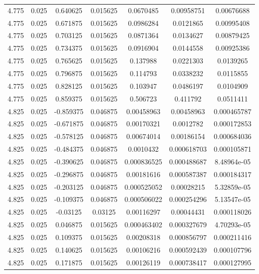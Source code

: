 \begin{table}[bh]
\begin{center}
{\begin{tabular}{ccccccc}
4.775	 & 0.025 & 	0.640625	 & 0.015625	 & 0.0670485	 & 0.00958751	 & 0.00676688 \\ 
4.775	 & 0.025 & 	0.671875	 & 0.015625	 & 0.0986284	 & 0.0121865	 & 0.00995408 \\ 
4.775	 & 0.025 & 	0.703125	 & 0.015625	 & 0.0871364	 & 0.0134627	 & 0.00879425 \\ 
4.775	 & 0.025 & 	0.734375	 & 0.015625	 & 0.0916904	 & 0.0144558	 & 0.00925386 \\ 
4.775	 & 0.025 & 	0.765625	 & 0.015625	 & 0.137988	 & 0.0221303	 & 0.0139265 \\ 
4.775	 & 0.025 & 	0.796875	 & 0.015625	 & 0.114793	 & 0.0338232	 & 0.0115855 \\ 
4.775	 & 0.025 & 	0.828125	 & 0.015625	 & 0.103947	 & 0.0486197	 & 0.0104909 \\ 
4.775	 & 0.025 & 	0.859375	 & 0.015625	 & 0.506723	 & 0.411792	 & 0.0511411 \\ 
4.825	 & 0.025 & 	-0.859375	 & 0.046875	 & 0.00458963	 & 0.00458963	 & 0.000465787 \\ 
4.825	 & 0.025 & 	-0.671875	 & 0.046875	 & 0.00170321	 & 0.0012782	 & 0.000172853 \\ 
4.825	 & 0.025 & 	-0.578125	 & 0.046875	 & 0.00674014	 & 0.00186154	 & 0.000684036 \\ 
4.825	 & 0.025 & 	-0.484375	 & 0.046875	 & 0.0010432	 & 0.000618703	 & 0.000105871 \\ 
4.825	 & 0.025 & 	-0.390625	 & 0.046875	 & 0.000836525	 & 0.000488687	 & 8.48964e-05 \\ 
4.825	 & 0.025 & 	-0.296875	 & 0.046875	 & 0.00181616	 & 0.000587387	 & 0.000184317 \\ 
4.825	 & 0.025 & 	-0.203125	 & 0.046875	 & 0.000525052	 & 0.00028215	 & 5.32859e-05 \\ 
4.825	 & 0.025 & 	-0.109375	 & 0.046875	 & 0.000506022	 & 0.000254296	 & 5.13547e-05 \\ 
4.825	 & 0.025 & 	-0.03125	 & 0.03125	 & 0.00116297	 & 0.00044431	 & 0.000118026 \\ 
4.825	 & 0.025 & 	0.046875	 & 0.015625	 & 0.000463402	 & 0.000327679	 & 4.70293e-05 \\ 
4.825	 & 0.025 & 	0.109375	 & 0.015625	 & 0.00208318	 & 0.000856797	 & 0.000211416 \\ 
4.825	 & 0.025 & 	0.140625	 & 0.015625	 & 0.00106216	 & 0.000592439	 & 0.000107796 \\ 
4.825	 & 0.025 & 	0.171875	 & 0.015625	 & 0.00126119	 & 0.000738417	 & 0.000127995 \\ 

\end{tabular}}
\end{center}
\end{table}
